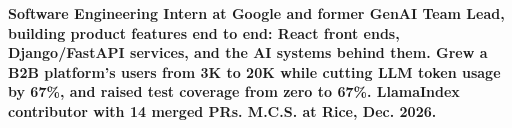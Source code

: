 \item\small{\textbf{Software Engineering Intern at Google and former GenAI Team Lead, building product features end to end: React front ends, Django/FastAPI services, and the AI systems behind them. Grew a B2B platform's users from \textbf{3K to 20K} while cutting LLM token usage by \textbf{67\%}, and raised test coverage from \textbf{zero to 67\%}. LlamaIndex contributor with \textbf{14} merged PRs. M.C.S. at Rice, Dec. 2026.}}%